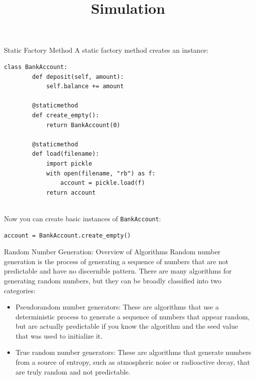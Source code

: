 \documentclass{beamer}
\newcommand{\code}[1]{{\color{blue}\texttt{#1}}}
\begin{document}
\begin{frame}[fragile]{Static Factory Method}
    A static factory method creates an instance:
    \begin{lstlisting}[style=python]
    class BankAccount:
        def deposit(self, amount):
            self.balance += amount
            
        @staticmethod
        def create_empty():
            return BankAccount(0)
        
        @staticmethod
        def load(filename):
            import pickle
            with open(filename, "rb") as f:
                account = pickle.load(f)
            return account
    
    \end{lstlisting}
    Now you can create basic instances of \code{BankAccount}:
    \begin{lstlisting}[style=python]
    account = BankAccount.create_empty()
    \end{lstlisting}
\end{frame}






\title{Simulation}
\begin{frame}
  \maketitle
\end{frame}

\begin{frame}[fragile]{Random Number Generation: Overview of Algorithms}
    Random number generation is the process of generating a sequence of numbers that are not predictable and have no discernible pattern. There are many algorithms for generating random numbers, but they can be broadly classified into two categories:
    \begin{itemize}
        \item Pseudorandom number generators: These are algorithms that use a deterministic process to generate a sequence of numbers that appear random, but are actually predictable if you know the algorithm and the seed value that was used to initialize it.
        \item True random number generators: These are algorithms that generate numbers from a source of entropy, such as atmospheric noise or radioactive decay, that are truly random and not predictable.
    \end{itemize}
\end{frame}
\end{document}
